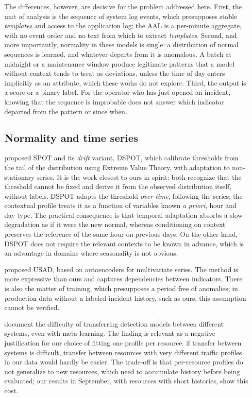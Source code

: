 \documentclass[sigconf,nonacm]{acmart}
\begin{document}
The differences, however, are decisive for the problem addressed here. First, the unit of analysis is the sequence of system log events, which presupposes stable \emph{templates} and access to the application log; the AAL is a per-minute aggregate, with no event order and no text from which to extract \emph{templates}. Second, and more importantly, normality in these models is single: a distribution of normal sequences is learned, and whatever departs from it is anomalous. A batch at midnight or a maintenance window produce legitimate patterns that a model without context tends to treat as deviations, unless the time of day enters implicitly as an attribute, which these works do not explore. Third, the output is a score or a binary label. For the operator who has just opened an incident, knowing that the sequence is improbable does not answer which indicator departed from the pattern or since when.

\subsection{Normality and time series}
\citet{siffer2017spot} proposed SPOT and its \emph{drift} variant, DSPOT, which calibrate thresholds from the tail of the distribution using Extreme Value Theory, with adaptation to non-stationary series. It is the work closest to ours in spirit: both recognize that the threshold cannot be fixed and derive it from the observed distribution itself, without labels. DSPOT adapts the threshold \emph{over time}, following the series; the contextual profile treats it as a function of variables known \emph{a priori}, hour and day type. The practical consequence is that temporal adaptation absorbs a slow degradation as if it were the new normal, whereas conditioning on context preserves the reference of the same hour on previous days. On the other hand, DSPOT does not require the relevant contexts to be known in advance, which is an advantage in domains where seasonality is not obvious.

\citet{audibert2020usad} proposed USAD, based on autoencoders for multivariate series. The method is more expressive than ours and captures dependencies between indicators. There is also the matter of training, which presupposes a period free of anomalies; in production data without a labeled incident history, such as ours, this assumption cannot be verified.

\citet{wang2025crosssystem} document the difficulty of transferring detection models between different systems, even with meta-learning. The finding is relevant as a negative justification for our choice of fitting one profile per resource: if transfer between systems is difficult, transfer between resources with very different traffic profiles in our data would hardly be easier. The trade-off is that per-resource profiles do not generalize to new resources, which need to accumulate history before being evaluated; our results in September, with resources with short histories, show this cost.
\end{document}
